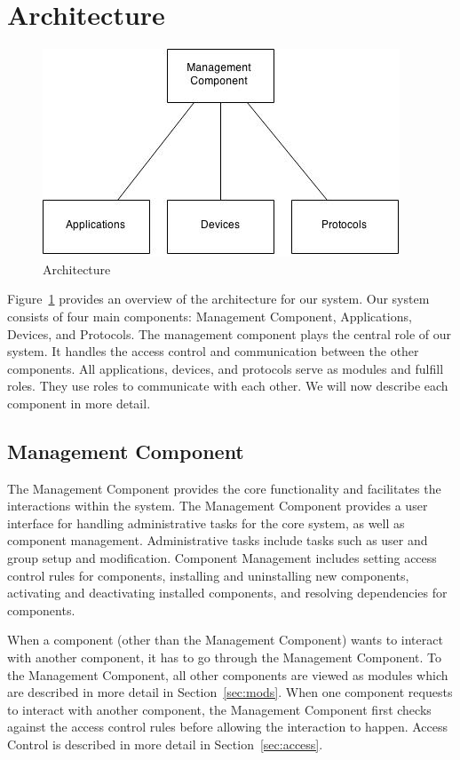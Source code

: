 \section{Architecture}
\label{sec:arch}
\begin{figure}[tbh]
    \centering
    \includegraphics[width=1.0\columnwidth]{figs/homeOSArch.jpg}
    \caption{Architecture}
    \label{Fig:Arch}
\end{figure}
Figure~\ref{Fig:Arch} provides an overview of the architecture for our system.
Our system consists of four main components: Management Component, Applications,
Devices, and Protocols. The management component plays the central role of our
system. It handles the access control and communication between the other
components. All applications, devices, and protocols serve as modules and
fulfill roles. They use roles to communicate with each other. We will now
describe each component in more detail.
\subsection{Management Component}
\label{sec:mgmt}
The Management Component provides the core functionality and facilitates the
interactions within the system. The Management Component provides a user
interface for handling administrative tasks for the core system, as well as
component management. Administrative tasks include tasks such as user and
group setup and modification. Component Management includes setting access
control rules for components, installing and uninstalling new components,
activating and deactivating installed components, and resolving dependencies
for components. 

When a component (other than the Management Component) wants to interact with
another component, it has to go through the Management Component. To the
Management Component, all other components are viewed as modules which are
described in more detail in Section~\ref{sec:mods}. When one component requests
to interact with another component, the Management Component first checks
against the access control rules before allowing the interaction to happen.
Access Control is described in more detail in Section~\ref{sec:access}.
